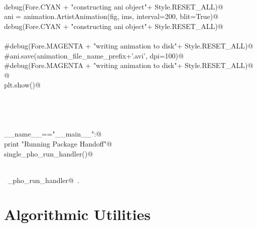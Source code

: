 \documentclass[10.0pt]{report}
\begin{document}
\begin{appendices}
\begin{flushleft}
\begin{list}{}{}
\mbox{}\verb@@\\
\mbox{}\verb@    debug(Fore.CYAN + "\nStarted constructing ani object"+ Style.RESET_ALL)@\\
\mbox{}\verb@    ani = animation.ArtistAnimation(fig, ims, interval=200, blit=True)@\\
\mbox{}\verb@    debug(Fore.CYAN + "\nFinished constructing ani object"+ Style.RESET_ALL)@\\
\mbox{}\verb@@\\
\mbox{}\verb@    #debug(Fore.MAGENTA + "\nStarted writing animation to disk"+ Style.RESET_ALL)@\\
\mbox{}\verb@    #ani.save(animation_file_name_prefix+'.avi', dpi=100)@\\
\mbox{}\verb@    #debug(Fore.MAGENTA + "\nFinished writing animation to disk"+ Style.RESET_ALL)@\\
\mbox{}\verb@    @\\
\mbox{}\verb@    plt.show()@\\
\mbox{}\verb@@\\
\mbox{}\verb@@\\
\mbox{}\verb@@\\
\mbox{}\verb@@\\
\mbox{}\verb@if __name__=="__main__":@\\
\mbox{}\verb@     print "Running Package Handoff"@\\
\mbox{}\verb@     single_pho_run_handler()@\\
\mbox{}\verb@@\\
\mbox{}\verb@@{\NWsep}
\end{list}
\vspace{-1.5ex}
\footnotesize
\begin{list}{}{\setlength{\itemsep}{-\parsep}\setlength{\itemindent}{-\leftmargin}}
\item \NWtxtIdentsUsed\nobreak\  \verb@single_pho_run_handler@\nobreak\ .
\item{}
\end{list}
\vspace{4ex}
\end{flushleft}


\section{Algorithmic Utilities}


\end{appendices}
\end{document}

